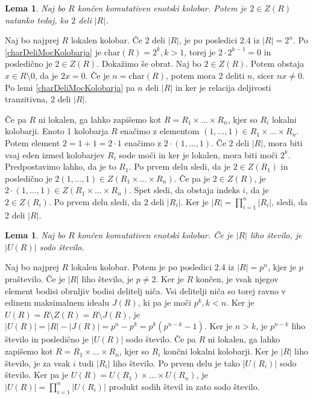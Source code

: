 \documentclass[a4paper, 12pt]{amsart}
\theoremstyle{definition} %
\theoremstyle{plain} %
\newtheorem{lema}[definicija]{Lema}
\begin{document}
\begin{lema}
\label{regular2}
Naj bo $R$ končen komutativen enotski kolobar. Potem je $2\in Z(R)$ natanko tedaj, ko $2$ deli $|R|$.
\end{lema}

\proof
Naj bo najprej $R$ lokalen kolobar. Če $2$ deli $|R|$, je po posledici 2.4 iz \cite{diploma} $|R| = 2^n$. Po \ref{charDeliMocKolobarja} je $\textrm{char}(R) = 2^k, k > 1$, torej je $2 \cdot 2^{k-1} = 0$ in posledično je $2\in Z(R)$. 
Dokažimo še obrat. Naj bo $2\in Z(R)$. Potem obstaja $x\in R\setminus{0}$, da je $2x = 0$. Če je $n = \textrm{char}(R)$, potem mora 2 deliti $n$, sicer $nx\neq 0$. Po lemi \ref{charDeliMocKolobarja} pa $n$ deli $|R|$ in ker je relacija deljivosti tranzitivna, 2 deli $|R|$.

Če pa $R$ ni lokalen, ga lahko zapišemo kot $R = R_1 \times \dots \times R_n$, kjer so $R_i$ lokalni kolobarji. Enoto 1 kolobarja $R$ enačimo z elementom $(1,\dots,1)\in R_1 \times \dots \times R_n$. Potem element $2 = 1+1 = 2 \cdot 1$ enačimo z $2\cdot (1,\dots,1)$. Če $2$ deli $|R|$, mora biti vsaj eden izmed kolobarjev $R_i$ sode moči in ker je lokalen, mora biti moči $2^k$. Predpostavimo lahko, da je to $R_1$. Po prvem delu sledi, da je $2\in Z(R_1)$ in posledično je $2(1,\dots,1) \in Z(R_1\times \dots \times R_n)$. Če pa je $2\in Z(R)$, je $2\cdot (1,\dots,1) \in Z(R_1\times \dots \times R_n)$. Spet sledi, da obstaja indeks $i$, da je $2\in Z(R_i)$. Po prvem delu sledi, da 2 deli $|R_i|$. Ker je $|R| = \prod_{i=1}^n |R_i|$, sledi, da 2 deli $|R|$.
\endproof

\begin{lema}
\label{regular3}
Naj bo $R$ končen komutativen enotski kolobar. Če je $|R|$ liho število, je $|U(R)|$ sodo število.
\end{lema}

\proof
Naj bo najprej $R$ lokalen kolobar. Potem je po posledici 2.4 iz \cite{diploma} $|R| = p^n$, kjer je $p$ praštevilo. Če je $|R|$ liho število, je $p\neq 2$. Ker je $R$ končen, je vsak njegov element bodisi obrnljiv bodisi delitelj niča. Vsi delitelji niča so torej ravno v edinem maksimalnem idealu $J(R)$, ki pa je moči $p^k, k < n$. Ker je $U(R) = R \setminus Z(R) = R \setminus J(R)$, je $|U(R)| = |R| - |J(R) | = p^n - p ^k = p^k(p^{n-k} -1)$. Ker je $n>k$, je $p^{n-k}$ liho število in posledično je $|U(R)|$ sodo število. Če pa $R$ ni lokalen, ga lahko zapišemo kot $R= R_1 \times \dots \times R_n$, kjer so $R_i$ končni lokalni kolobarji. Ker je $|R|$ liho število, je za vsak $i$ tudi $|R_i|$ liho število. Po prvem delu je tako $|U(R_i)| $ sodo število. Ker pa je $U(R) = U(R_1) \times \dots \times U(R_n)$, je $|U(R)| = \prod_{i=1}^n |U(R_i)|$ produkt sodih števil in zato sodo število.
\endproof
\end{document}
